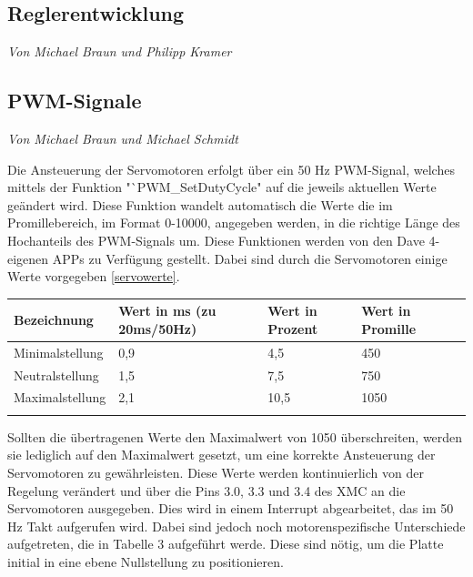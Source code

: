 \documentclass[12pt,a4paper,bibliography=totoc,listof=totoc]{scrartcl}
\begin{document}
\subsection{Reglerentwicklung}
\textit{Von Michael Braun und Philipp Kramer}\newline

\subsection{PWM-Signale}
\textit{Von Michael Braun und Michael Schmidt}\newline

Die Ansteuerung der Servomotoren erfolgt über ein 50 Hz PWM-Signal, welches mittels der Funktion 
"`PWM_SetDutyCycle" auf die jeweils aktuellen Werte geändert wird. Diese Funktion wandelt automatisch 
die Werte die im Promillebereich, im Format 0-10000, angegeben werden, in die richtige Länge des 
Hochanteils des PWM-Signals um. Diese Funktionen werden von den Dave 4- eigenen APPs zu Verfügung 
gestellt. Dabei sind durch die Servomotoren einige Werte vorgegeben \ref {servowerte}.

\begin{tabularx}{\textwidth}{p{}|X|X|X|X|}
Bezeichnung 		& Wert in ms (zu 20ms/50Hz) & Wert in Prozent 	& Wert in Promille \\
\hline
Minimalstellung		& 0,9						& 4,5				& 450 \\
\hline

Neutralstellung		& 1,5						& 7,5				& 750 \\
\hline

Maximalstellung		&2,1						& 10,5				& 1050\\
\hline
\caption{Tabelle: Werte der Servomotoren}
\label{tbl:servowerte}
\end{tabularx}

Sollten die übertragenen Werte den Maximalwert von 1050 überschreiten, werden sie lediglich auf den 
Maximalwert gesetzt, um eine korrekte Ansteuerung der Servomotoren zu gewährleisten. Diese Werte werden 
kontinuierlich von der Regelung verändert und über die Pins 3.0, 3.3 und 3.4 des XMC an die Servomotoren 
ausgegeben. Dies wird in einem Interrupt abgearbeitet, das im 50 Hz Takt aufgerufen wird. Dabei sind jedoch 
noch motorenspezifische Unterschiede aufgetreten, die in Tabelle 3 aufgeführt werde. Diese sind nötig, um 
die Platte initial in eine ebene Nullstellung zu positionieren.
\end{document}
